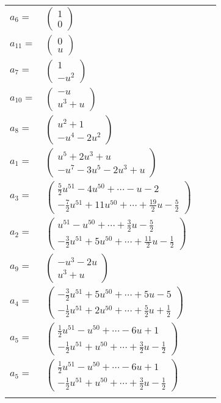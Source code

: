 \documentclass[1p]{elsarticle_modified}
\theoremstyle{definition}
\begin{document}
\begin{tabular}{m{7pt} m{180pt} m{7pt} m{180pt} }
\flushright $a_{6}=$&$\begin{pmatrix}1\\0\end{pmatrix}$ \\
\flushright $a_{11}=$&$\begin{pmatrix}0\\u\end{pmatrix}$ \\
\flushright $a_{7}=$&$\begin{pmatrix}1\\- u^2\end{pmatrix}$ \\
\flushright $a_{10}=$&$\begin{pmatrix}- u\\u^3+u\end{pmatrix}$ \\
\flushright $a_{8}=$&$\begin{pmatrix}u^2+1\\- u^4-2 u^2\end{pmatrix}$ \\
\flushright $a_{1}=$&$\begin{pmatrix}u^5+2 u^3+u\\- u^7-3 u^5-2 u^3+u\end{pmatrix}$ \\
\flushright $a_{3}=$&$\begin{pmatrix}\frac{5}{2} u^{51}-4 u^{50}+\cdots- u-2\\-\frac{7}{2} u^{51}+11 u^{50}+\cdots+\frac{19}{2} u-\frac{5}{2}\end{pmatrix}$ \\
\flushright $a_{2}=$&$\begin{pmatrix}u^{51}- u^{50}+\cdots+\frac{3}{2} u-\frac{5}{2}\\-\frac{3}{2} u^{51}+5 u^{50}+\cdots+\frac{11}{2} u-\frac{1}{2}\end{pmatrix}$ \\
\flushright $a_{9}=$&$\begin{pmatrix}- u^3-2 u\\u^3+u\end{pmatrix}$ \\
\flushright $a_{4}=$&$\begin{pmatrix}-\frac{3}{2} u^{51}+5 u^{50}+\cdots+5 u-5\\-\frac{1}{2} u^{51}+2 u^{50}+\cdots+\frac{5}{2} u+\frac{1}{2}\end{pmatrix}$ \\
\flushright $a_{5}=$&$\begin{pmatrix}\frac{1}{2} u^{51}- u^{50}+\cdots-6 u+1\\-\frac{1}{2} u^{51}+u^{50}+\cdots+\frac{3}{2} u-\frac{1}{2}\end{pmatrix}$\\ \flushright $a_{5}=$&$\begin{pmatrix}\frac{1}{2} u^{51}- u^{50}+\cdots-6 u+1\\-\frac{1}{2} u^{51}+u^{50}+\cdots+\frac{3}{2} u-\frac{1}{2}\end{pmatrix}$\\&\end{tabular}
\end{document}
